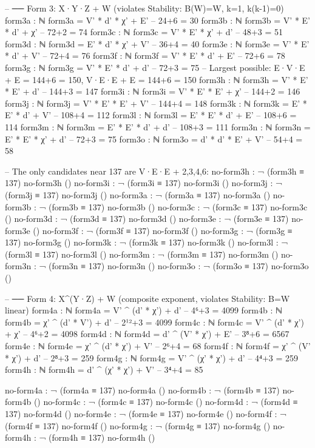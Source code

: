 \documentclass[11pt,a4paper]{article}
\begin{document}
\begin{code}
-- ── Form 3: X·Y·Z + W  (violates Stability: B(W)=W, k=1, k(k-1)=0)
form3a : ℕ
form3a = V' * d' * χ' + E'                 -- 24+6 = 30
form3b : ℕ
form3b = V' * E' * d' + χ'                 -- 72+2 = 74
form3c : ℕ
form3c = V' * E' * χ' + d'                 -- 48+3 = 51
form3d : ℕ
form3d = E' * d' * χ' + V'                 -- 36+4 = 40
form3e : ℕ
form3e = V' * E' * d' + V'                 -- 72+4 = 76
form3f : ℕ
form3f = V' * E' * d' + E'                 -- 72+6 = 78
form3g : ℕ
form3g = V' * E' * d' + d'                 -- 72+3 = 75
-- Largest possible: E·V·E + E = 144+6 = 150, V·E·E + E = 144+6 = 150
form3h : ℕ
form3h = V' * E' * E' + d'                 -- 144+3 = 147
form3i : ℕ
form3i = V' * E' * E' + χ'                 -- 144+2 = 146
form3j : ℕ
form3j = V' * E' * E' + V'                 -- 144+4 = 148
form3k : ℕ
form3k = E' * E' * d' + V'                 -- 108+4 = 112
form3l : ℕ
form3l = E' * E' * d' + E'                 -- 108+6 = 114
form3m : ℕ
form3m = E' * E' * d' + d'                 -- 108+3 = 111
form3n : ℕ
form3n = E' * E' * χ' + d'                 -- 72+3 = 75
form3o : ℕ
form3o = d' * d' * E' + V'                 -- 54+4 = 58

-- The only candidates near 137 are V·E·E + {2,3,4,6}:
no-form3h : ¬ (form3h ≡ 137)
no-form3h ()
no-form3i : ¬ (form3i ≡ 137)
no-form3i ()
no-form3j : ¬ (form3j ≡ 137)
no-form3j ()
no-form3a : ¬ (form3a ≡ 137)
no-form3a ()
no-form3b : ¬ (form3b ≡ 137)
no-form3b ()
no-form3c : ¬ (form3c ≡ 137)
no-form3c ()
no-form3d : ¬ (form3d ≡ 137)
no-form3d ()
no-form3e : ¬ (form3e ≡ 137)
no-form3e ()
no-form3f : ¬ (form3f ≡ 137)
no-form3f ()
no-form3g : ¬ (form3g ≡ 137)
no-form3g ()
no-form3k : ¬ (form3k ≡ 137)
no-form3k ()
no-form3l : ¬ (form3l ≡ 137)
no-form3l ()
no-form3m : ¬ (form3m ≡ 137)
no-form3m ()
no-form3n : ¬ (form3n ≡ 137)
no-form3n ()
no-form3o : ¬ (form3o ≡ 137)
no-form3o ()
\end{code}

\begin{code}
-- ── Form 4: X^(Y·Z) + W  (composite exponent, violates Stability: B=W linear)
form4a : ℕ
form4a = V' ^ (d' * χ') + d'               -- 4⁶+3 = 4099
form4b : ℕ
form4b = χ' ^ (d' * V') + d'               -- 2¹²+3 = 4099
form4c : ℕ
form4c = V' ^ (d' * χ') + χ'               -- 4⁶+2 = 4098
form4d : ℕ
form4d = d' ^ (V' * χ') + E'               -- 3⁸+6 = 6567
form4e : ℕ
form4e = χ' ^ (d' * χ') + V'               -- 2⁶+4 = 68
form4f : ℕ
form4f = χ' ^ (V' * χ') + d'               -- 2⁸+3 = 259
form4g : ℕ
form4g = V' ^ (χ' * χ') + d'               -- 4⁴+3 = 259
form4h : ℕ
form4h = d' ^ (χ' * χ') + V'               -- 3⁴+4 = 85

no-form4a : ¬ (form4a ≡ 137)
no-form4a ()
no-form4b : ¬ (form4b ≡ 137)
no-form4b ()
no-form4c : ¬ (form4c ≡ 137)
no-form4c ()
no-form4d : ¬ (form4d ≡ 137)
no-form4d ()
no-form4e : ¬ (form4e ≡ 137)
no-form4e ()
no-form4f : ¬ (form4f ≡ 137)
no-form4f ()
no-form4g : ¬ (form4g ≡ 137)
no-form4g ()
no-form4h : ¬ (form4h ≡ 137)
no-form4h ()
\end{code}
\end{document}
